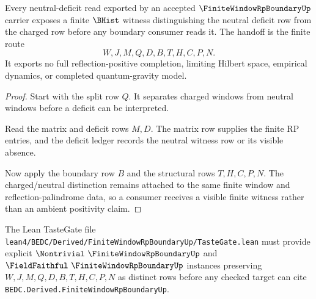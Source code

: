 \begin{theorem}
\label{thm:finite-window-rp-deficit-handoff}
Every neutral-deficit read exported by an accepted $\FiniteWindowRpBoundaryUp$ carrier exposes a finite $\BHist$ witness distinguishing the neutral deficit row from the charged row before any boundary consumer reads it. The handoff is the finite route
$$
W,J,M,Q,D,B,T,H,C,P,N .
$$
It exports no full reflection-positive completion, limiting Hilbert space, empirical dynamics, or completed quantum-gravity model.
\end{theorem}
\begin{proof}
Start with the split row $Q$. It separates charged windows from neutral windows before a deficit can be interpreted.

Read the matrix and deficit rows $M,D$. The matrix row supplies the finite RP entries, and the deficit ledger records the neutral witness row or its visible absence.

Now apply the boundary row $B$ and the structural rows $T,H,C,P,N$. The charged/neutral distinction remains attached to the same finite window and reflection-palindrome data, so a consumer receives a visible finite witness rather than an ambient positivity claim.
\end{proof}



The Lean TasteGate file \texttt{lean4/BEDC/Derived/FiniteWindowRpBoundaryUp/TasteGate.lean} must provide explicit $\Nontrivial\ \FiniteWindowRpBoundaryUp$ and $\FieldFaithful\ \FiniteWindowRpBoundaryUp$ instances preserving $W,J,M,Q,D,B,T,H,C,P,N$ as distinct rows before any checked target can cite \texttt{BEDC.Derived.FiniteWindowRpBoundaryUp}.


